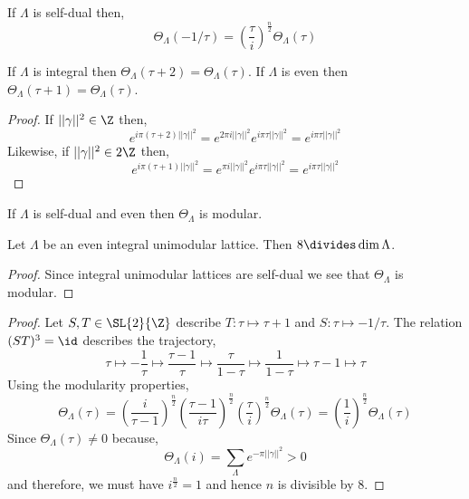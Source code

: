 \documentclass[12pt]{article}
\begin{document}
\begin{cor}
If $\Lambda$ is self-dual then,
\[ \Theta_{\Lambda}(-1/\tau) = \left( \frac{\tau}{i} \right)^{\frac{n}{2}} \Theta_{\Lambda}(\tau) \]
\end{cor}

\begin{prop}
If $\Lambda$ is integral then $\Theta_{\Lambda}(\tau + 2) = \Theta_{\Lambda}(\tau)$. If $\Lambda$ is even then $\Theta_{\Lambda}(\tau + 1) = \Theta_{\Lambda}(\tau)$.
\end{prop}

\begin{proof}
If $||\gamma||^2 \in \Z$ then,
\[ e^{i \pi (\tau + 2) || \gamma ||^2} = e^{2 \pi i || \gamma ||^2} e^{i \pi \tau || \gamma ||^2} = e^{i \pi \tau || \gamma ||^2} \] Likewise, if $|| \gamma ||^2 \in 2 \Z$ then,
\[ e^{i \pi (\tau + 1) || \gamma ||^2} = e^{\pi i || \gamma ||^2} e^{i \pi \tau || \gamma ||^2} = e^{i \pi \tau || \gamma ||^2} \]
\end{proof}

\begin{cor}
If $\Lambda$ is self-dual and even then $\Theta_{\Lambda}$ is modular.
\end{cor}

\begin{thm}
Let $\Lambda$ be an even integral unimodular lattice. Then $8 \divides \dim{\Lambda}$. 
\end{thm}

\begin{proof}
Since integral unimodular lattices are self-dual we see that $\Theta_{\Lambda}$ is modular. 
\end{proof}

\begin{proof}
Let $S, T \in \SL{2}{\Z}$ describe $T : \tau \mapsto \tau + 1$ and $S : \tau \mapsto -1/\tau$. The relation $(ST)^3 = \id$ describes the trajectory,
\[ \tau \mapsto - \frac{1}{\tau} \mapsto \frac{\tau - 1}{\tau} \mapsto \frac{\tau}{1 - \tau} \mapsto \frac{1}{1 - \tau} \mapsto \tau - 1 \mapsto \tau \]
Using the modularity properties,
\[ \Theta_{\Lambda}(\tau) = \left( \frac{i}{\tau - 1} \right)^{\frac{n}{2}} \left( \frac{\tau - 1}{i \tau} \right)^{\frac{n}{2}} \left( \frac{\tau}{i} \right)^{\frac{n}{2}} \Theta_{\Lambda}(\tau) = \left( \frac{1}{i} \right)^{\frac{n}{2}} \Theta_{\Lambda}(\tau) \]
Since $\Theta_{\Lambda}(\tau) \neq 0$ because,
\[ \Theta_{\Lambda}(i) = \sum_{\Lambda} e^{- \pi || \gamma ||^2} > 0 \]
and therefore, we must have $i^{\frac{n}{2}} = 1$ and hence $n$ is divisible by $8$. 
\end{proof}
\end{document}
